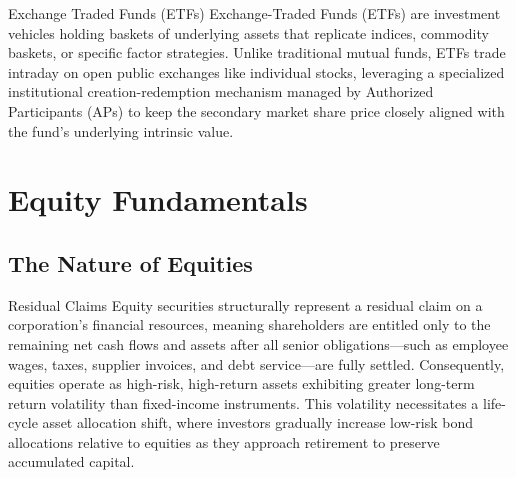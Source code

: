 \documentclass[10pt]{article}
\begin{document}
    \begin{core}{Exchange Traded Funds (ETFs)}
      Exchange-Traded Funds (ETFs) are investment vehicles holding baskets of underlying assets that replicate indices, commodity baskets, or specific factor strategies. Unlike traditional mutual funds, ETFs trade intraday on open public exchanges like individual stocks, leveraging a specialized institutional creation-redemption mechanism managed by Authorized Participants (APs) to keep the secondary market share price closely aligned with the fund's underlying intrinsic value.
    \end{core}

\section{Equity Fundamentals}

  \subsection{The Nature of Equities}

    \begin{core}{Residual Claims}
      Equity securities structurally represent a residual claim on a corporation's financial resources, meaning shareholders are entitled only to the remaining net cash flows and assets after all senior obligations—such as employee wages, taxes, supplier invoices, and debt service—are fully settled. Consequently, equities operate as high-risk, high-return assets exhibiting greater long-term return volatility than fixed-income instruments. This volatility necessitates a life-cycle asset allocation shift, where investors gradually increase low-risk bond allocations relative to equities as they approach retirement to preserve accumulated capital.
    \end{core}
\end{document}
